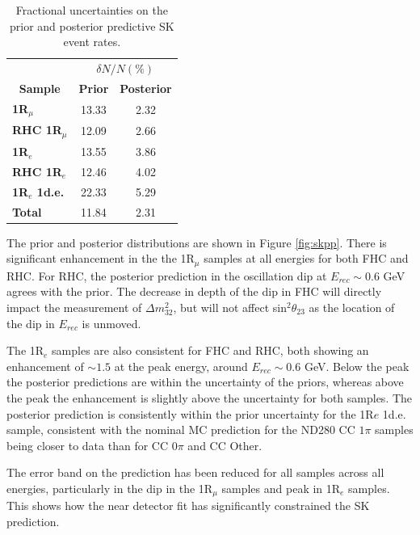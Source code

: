 \begin{center}
\begin{table}[!htbp]
\center
\begin{tabular}{l||c c}
\hline \hline
& \multicolumn{2}{c}{$\delta N/N (\%)$}\\
\multicolumn{1}{c||}{\textbf{Sample}} & \multicolumn{1}{c}{\textbf{Prior}} & \multicolumn{1}{c}{\textbf{Posterior}} \\
\hline\hline
\textbf{1R$_{\mu}$} & 13.33 & 2.32\\
\textbf{RHC 1R$_{\mu}$} & 12.09 & 2.66\\ 
\textbf{1R$_{e}$} & 13.55 & 3.86\\
\textbf{RHC 1R$_{e}$} & 12.46 & 4.02\\
\textbf{1R$_{e}$ 1d.e.} & 22.33 & 5.29\\ \hline
\textbf{Total} & 11.84 & 2.31\\ \hline\hline
\end{tabular}
\caption{Fractional uncertainties on the prior and posterior predictive SK event rates.}
\label{tab:SKerr}
\end{table}
\end{center}

The prior and posterior distributions are shown in Figure \ref{fig:skpp}. There is significant enhancement in the the 1R$_{\mu}$ samples at all energies for both FHC and RHC. For RHC, the posterior prediction in the oscillation dip at $E_{rec}\sim$0.6 GeV agrees with the prior. The decrease in depth of the dip in FHC will directly impact the measurement of $\Delta m_{32}^2$, but will not affect sin$^{2}\theta_{23}$ as the location of the dip in $E_{rec}$ is unmoved. 

The 1R$_{e}$ samples are also consistent for FHC and RHC, both showing an enhancement of $\sim1.5$ at the peak energy, around $E_{rec}\sim0.6$ GeV. Below the peak the posterior predictions are within the uncertainty of the priors, whereas above the peak the enhancement is slightly above the uncertainty for both samples. The posterior prediction is consistently within the prior uncertainty for the 1R$e$ 1d.e. sample, consistent with the nominal MC prediction for the ND280 CC $1\pi$ samples being closer to data than for CC $0\pi$ and CC Other.

The error band on the prediction has been reduced for all samples across all energies, particularly in the dip in the 1R$_{\mu}$ samples and peak in 1R$_{e}$ samples. This shows how the near detector fit has significantly constrained the SK prediction.

